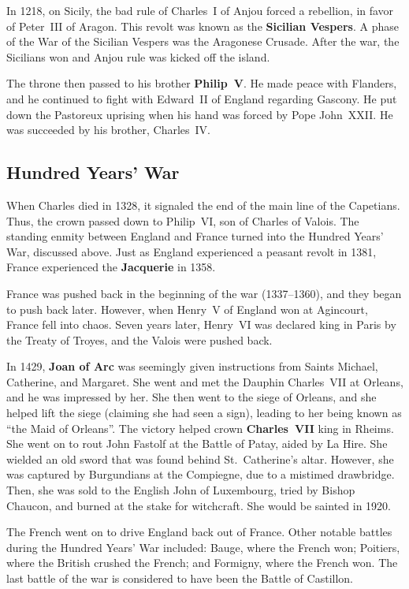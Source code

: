 In 1218, on Sicily, the bad rule of Charles~I of Anjou forced a rebellion, in favor of Peter~III of Aragon.
This revolt was known as the \textbf{Sicilian Vespers}.
A phase of the War of the Sicilian Vespers was the Aragonese Crusade.
After the war, the Sicilians won and Anjou rule was kicked off the island.

The throne then passed to his brother \textbf{Philip~V}.
He made peace with Flanders, and he continued to fight with Edward~II of England regarding Gascony.
He put down the Pastoreux uprising when his hand was forced by Pope John~XXII\@.
He was succeeded by his brother, Charles~IV\@.

\subsection*{Hundred Years' War}

When Charles died in 1328, it signaled the end of the main line of the Capetians.
Thus, the crown passed down to Philip~VI, son of Charles of Valois.
The standing enmity between England and France turned into the Hundred Years' War, discussed above.
Just as England experienced a peasant revolt in 1381, France experienced the \textbf{Jacquerie} in 1358.

France was pushed back in the beginning of the war (1337--1360), and they began to push back later.
However, when Henry~V of England won at Agincourt, France fell into chaos.
Seven years later, Henry~VI was declared king in Paris by the Treaty of Troyes, and the Valois were pushed back.

In 1429, \textbf{Joan of Arc} was seemingly given instructions from Saints Michael, Catherine, and Margaret.
She went and met the Dauphin Charles~VII at Orleans, and he was impressed by her.
She then went to the siege of Orleans, and she helped lift the siege (claiming she had seen a sign),
leading to her being known as ``the Maid of Orleans''.
The victory helped crown \textbf{Charles~VII} king in Rheims.
She went on to rout John Fastolf at the Battle of Patay, aided by La Hire.
She wielded an old sword that was found behind St.\ Catherine's altar.
However, she was captured by Burgundians at the Compiegne, due to a mistimed drawbridge.
Then, she was sold to the English John of Luxembourg, tried by Bishop Chaucon, and burned at the stake for witchcraft.
She would be sainted in 1920.

The French went on to drive England back out of France.
Other notable battles during the Hundred Years' War included:
Bauge, where the French won;
Poitiers, where the British crushed the French;
and Formigny, where the French won.
The last battle of the war is considered to have been the Battle of Castillon.

